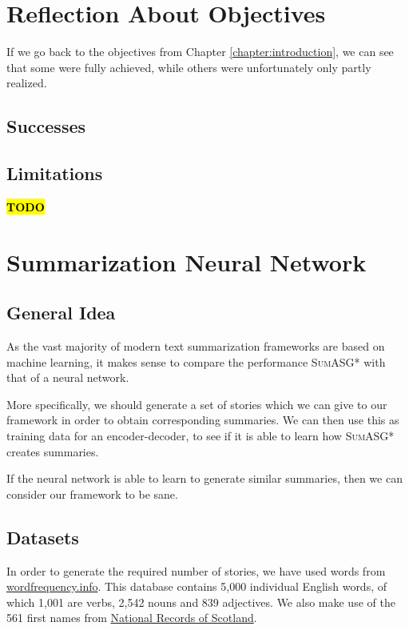 \label{chapter:evaluation}

\section{Reflection About Objectives}

If we go back to the objectives from Chapter \ref{chapter:introduction}, we can see that some were fully achieved, while others were unfortunately only partly realized.

\subsection{Successes}

\subsection{Limitations}

\textcolor{red}{\textbf{\hl{TODO}}}

\section{Summarization Neural Network}

\subsection{General Idea}

As the vast majority of modern text summarization frameworks are based on machine learning, it makes sense to compare the performance \textsc{SumASG*} with that of a neural network.

More specifically, we should generate a set of stories which we can give to our framework in order to obtain corresponding summaries. We can then use this as training data for an encoder-decoder, to see if it is able to learn how \textsc{SumASG*} creates summaries.

If the neural network is able to learn to generate similar summaries, then we can consider our framework to be sane.

\subsection{Datasets}

In order to generate the required number of stories, we have used words from \href{http://www.wordfrequency.info/}{wordfrequency.info}. This database contains 5,000 individual English words, of which 1,001 are verbs, 2,542 nouns and 839 adjectives. We also make use of the 561 first names from \href{https://www.nrscotland.gov.uk/statistics-and-data/statistics/statistics-by-theme/vital-events/names/babies-first-names/babies-first-names-summary-records-comma-separated-value-csv-format}{National Records of Scotland}.

